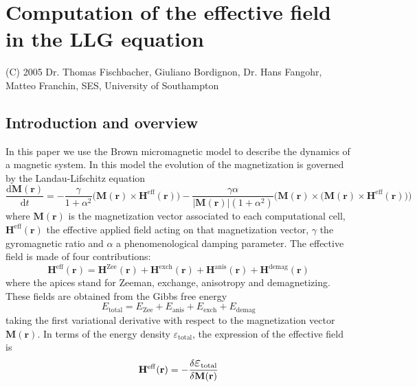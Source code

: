 \documentclass[11pt]{article}
\renewcommand{\d}{\mathrm{d}} %
\newcommand{\rv}[1]{\ensuremath{\mathbf{#1}}} %
\begin{document}
\tableofcontents
\section{Computation of the effective field in the LLG equation }
\label{module:demag_fieldMesh}


(C) 2005 Dr. Thomas Fischbacher, Giuliano Bordignon, Dr. Hans Fangohr,
Matteo Franchin, SES, University of Southampton
\subsection{Introduction and overview}

In this paper we use the Brown micromagnetic model to describe the
dynamics of a magnetic system. In this model the evolution of the
magnetization is governed by the Landau-Lifschitz equation 
\begin{equation}
\frac{\d \rv{M(r)}}{\d t} = 
-\frac{\gamma}{1 + \alpha^2} \Big( \rv{M(r)} \times
\rv{H}^\mathrm{eff}\rv{(r)} \Big) - \frac{\gamma
  \alpha}{|\rv{M(r)}|(1 + \alpha^2)} \Bigg( \rv{M(r)} \times \Big(
\rv{M(r)} \times \rv{H}^\mathrm{eff}\rv{(r)}\Big) \Bigg)  
\label{equ.LLGEquation}
\end{equation}
where $\rv{M(r)}$ is the magnetization vector associated to each
  computational cell, $\rv{H}^\mathrm{eff}\rv{(r)}$ the effective 
  applied field acting on that magnetization vector, $\gamma$ the
  gyromagnetic ratio and $\alpha$ a phenomenological damping
  parameter. The effective field is made of four contributions:
\begin{equation}
\rv{H}^\mathrm{eff}\rv{(r)} =  \rv{H}^\mathrm{Zee}\rv{(r)} +
\rv{H}^\mathrm{exch}\rv{(r)} + \rv{H}^\mathrm{anis}\rv{(r)} +
\rv{H}^\mathrm{demag}\rv{(r)}  
\label{equ.equilibriumField}
\end{equation}
where the apices stand for Zeeman, exchange, anisotropy and
demagnetizing. These fields are obtained from the Gibbs free
energy
\begin{equation}
  E_\mathrm{total}  =  E_\mathrm{Zee} + E_\mathrm{anis} + E_\mathrm{exch} + E_\mathrm{demag} 
\end{equation}
taking the first variational derivative with respect to the
magnetization vector $\rv{M(r)}$. In terms of the energy density
\Large{$\varepsilon$}\normalsize $_\mathrm{total}$, the expression of the effective field is
\begin{equation}
\rv{H}^\mathrm{eff}\rv{(r)} = - \frac{\delta \textrm{\Large{$\varepsilon$}\normalsize $_\mathrm{total}$}}{\delta \rv{M(r)}}
\label{equ.equilibriumCondition}
\end{equation}
\end{document}
